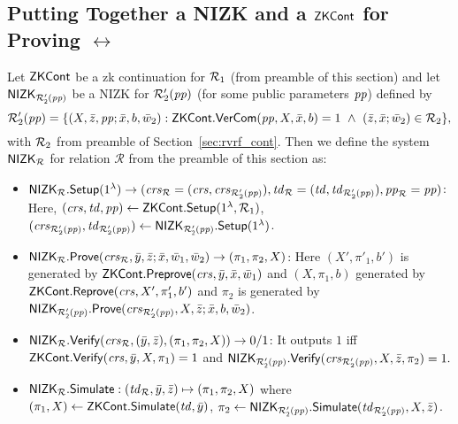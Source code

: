 \subsection{Putting Together a NIZK and a $\ZKCont$  for Proving $\rel$} \label{sec:nizkR}

Let $\ZKCont$ be a zk continuation for $\relone$ (from preamble of this section) and 
let $\nizktwo$ be a NIZK for $\reltwo'(\pp)$ (for some public parameters $\pp$) defined by 
$$\reltwo'(\pp) = \{(X, \barz, \pp; \barx, b, \baromega_2): \ZKCont.\VerifyCom(\pp, X, \barx, b) =1\ 
\wedge \ (\barz, \barx; \baromega_2) \in \reltwo \},$$ 
with $\reltwo$ from preamble of Section~\ref{sec:rvrf_cont}. Then we define the system $\nizkR$ for relation $\mathcal{R}$ 
from the preamble of this section as:
\begin{itemize}
\item $\nizkR.\Setup(1^{\lambda})\rightarrow (\crsR = (\crs,\crstwo), \twR = (\tw, \twtwo), \pp_\rel = \pp)$: Here,
$(\crs, \tw, \pp) \leftarrow \ZKCont.\Setup(1^{\lambda}, \relone)$, $(\crstwo, \twtwo) \leftarrow \nizktwo.\Setup(1^{\lambda})$.


\item $\nizkR.\Prove(\crsR,\bary, \barz; \barx, \baromega_1, \baromega_2 ) \rightarrow (\pi_1, \pi_2, X)$: Here 
$(X', \pi'_1, b')$ is generated by $\ZKCont.\Preprove(\crs, \bar{y}, \bar{x}, \baromega_1)$ and 
$(X, \pi_1, b)$ generated by  $\ZKCont.\Reprove(\crs, X', \pi_1', b')$ and $ \pi_2 $ is generated by
$ \nizktwo.\Prove(\crstwo, X, \barz; \barx, b, \baromega_2)$. 

\item $\nizkR.\Verify(\crsR,(\bary, \barz), (\pi_1, \pi_2, X)) \rightarrow 0/1$: It outputs $1$ iff 
$\ZKCont.\Verify(\crs, \bar{y}, X, \pi_1) = 1 $ and $ \nizktwo.\Verify(\crstwo, X, \barz, \pi_2) =1.$

\item $\nizkR.\Sim: (\twR, \bary, \barz) \mapsto (\pi_1, \pi_2, X)$ where 
$(\pi_1, X) \leftarrow \ZKCont.\Sim(\tw, \bary)$, $\pi_2 \leftarrow \nizktwo.\Sim(\twtwo, X, \barz)$.
 \end{itemize}
